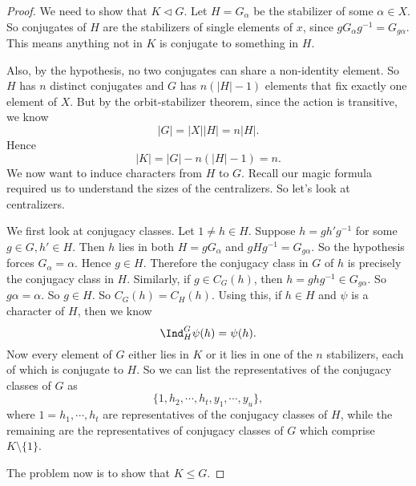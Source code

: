 \documentclass[a4paper]{article}
\begin{document}
\begin{proof}
  We need to show that $K \lhd G$. Let $H = G_\alpha$ be the stabilizer of some $\alpha \in X$. So conjugates of $H$ are the stabilizers of single elements of $x$, since $g G_\alpha g^{-1} = G_{g\alpha}$. This means anything not in $K$ is conjugate to something in $H$.

  Also, by the hypothesis, no two conjugates can share a non-identity element. So $H$ has $n$ distinct conjugates and $G$ has $n(|H| - 1)$ elements that fix exactly one element of $X$. But by the orbit-stabilizer theorem, since the action is transitive, we know
  \[
    |G| = |X| |H| = n|H|.
  \]
  Hence
  \[
    |K| = |G| - n(|H| - 1) = n.
  \]
  We now want to induce characters from $H$ to $G$. Recall our magic formula required us to understand the sizes of the centralizers. So let's look at centralizers.

  We first look at conjugacy classes. Let $1 \not= h \in H$. Suppose $h = gh' g^{-1}$ for some $g \in G, h' \in H$. Then $h$ lies in both $H = gG_\alpha$ and $gHg^{-1} = G_{g\alpha}$. So the hypothesis forces $G_\alpha = \alpha$. Hence $g \in H$. Therefore the conjugacy class in $G$ of $h$ is precisely the conjugacy class in $H$. Similarly, if $g \in C_G(h)$, then $h = ghg^{-1} \in G_{g\alpha}$. So $g\alpha = \alpha$. So $g \in H$. So $C_G(h) = C_H(h)$. Using this, if $h \in H$ and $\psi$ is a character of $H$, then we know
  \[
    \Ind_H^G \psi(h) = \psi (h).
  \]
  Now every element of $G$ either lies in $K$ or it lies in one of the $n$ stabilizers, each of which is conjugate to $H$. So we can list the representatives of the conjugacy classes of $G$ as
  \[
    \{1, h_2, \cdots, h_t, y_1, \cdots, y_u\},
  \]
  where $1 = h_1, \cdots, h_t$ are representatives of the conjugacy classes of $H$, while the remaining are the representatives of conjugacy classes of $G$ which comprise $K \setminus \{1\}$.

  The problem now is to show that $K \leq G$.


\end{proof}
\end{document}
